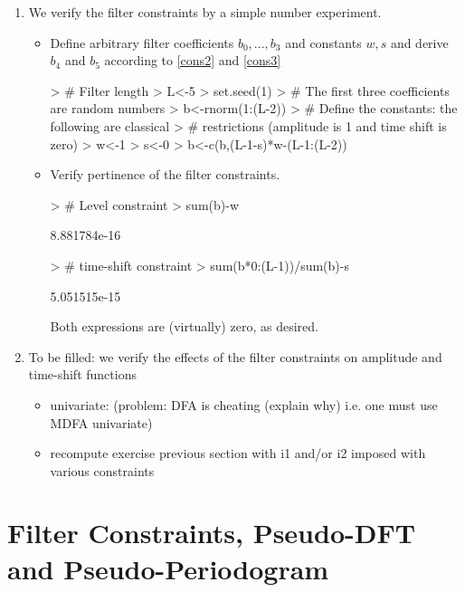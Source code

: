 \documentclass[a4paper]{book}
\begin{document}
\begin{enumerate}
\item We verify the filter constraints by a simple number experiment.
\begin{itemize}
\item Define arbitrary filter coefficients $b_0,...,b_3$ and constants $w,s$ and derive $b_4$ and $b_5$ according to \ref{cons2} and \ref{cons3} 
\begin{Schunk}
\begin{Sinput}
> # Filter length
> L<-5
> set.seed(1)
> # The first three coefficients are random numbers
> b<-rnorm(1:(L-2))
> # Define the constants: the following are classical 
> #   restrictions (amplitude is 1 and time shift is zero)
> w<-1
> s<-0
> b<-c(b,(L-1-s)*w-(L-1:(L-2))%
\end{Sinput}
\end{Schunk}
\item Verify pertinence of the filter constraints.
\begin{Schunk}
\begin{Sinput}
> # Level constraint
> sum(b)-w
\end{Sinput}
\begin{Soutput}
[1] 8.881784e-16
\end{Soutput}
\begin{Sinput}
> # time-shift constraint
> sum(b*0:(L-1))/sum(b)-s
\end{Sinput}
\begin{Soutput}
[1] 5.051515e-15
\end{Soutput}
\end{Schunk}
Both expressions are (virtually) zero, as desired.
\end{itemize}
\item To be filled: we verify the effects of the filter constraints on amplitude and time-shift functions 
\begin{itemize}
\item univariate: (problem: DFA is cheating (explain why) i.e. one must use MDFA univariate)
\item recompute exercise previous section with i1 and/or i2 imposed with various constraints
\end{itemize}
\end{enumerate}



\section{Filter Constraints, Pseudo-DFT and Pseudo-Periodogram}\label{pseudo_dft}
\end{document}
